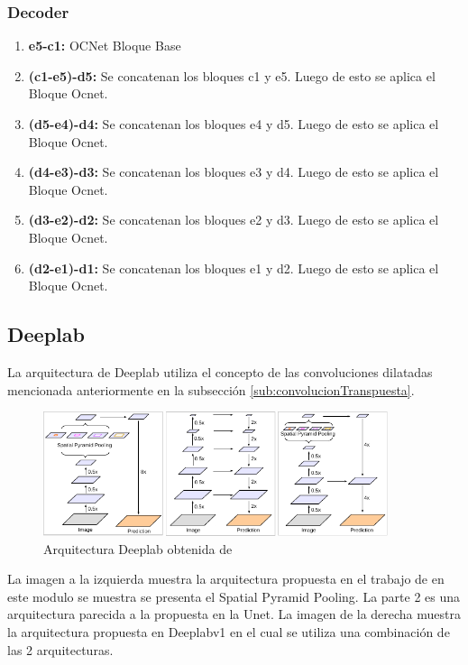 \subsubsection{Decoder}
    \begin{enumerate}
    \item \textbf{e5-c1:} OCNet Bloque Base
    \item \textbf{(c1-e5)-d5:}  Se concatenan los bloques c1 y e5. Luego de esto se  aplica el Bloque Ocnet.
    \item \textbf{(d5-e4)-d4:}  Se concatenan los bloques e4 y d5. Luego de esto se  aplica el Bloque Ocnet.
    \item \textbf{(d4-e3)-d3:}  Se concatenan los bloques e3 y d4. Luego de esto se  aplica el Bloque Ocnet.
    \item \textbf{(d3-e2)-d2:}  Se concatenan los bloques e2 y d3. Luego de esto se  aplica el Bloque Ocnet.
    \item \textbf{(d2-e1)-d1:}  Se concatenan los bloques e1 y d2. Luego de esto se  aplica el Bloque Ocnet.
    


    \end{enumerate}{}


\subsection{Deeplab}
La arquitectura de Deeplab utiliza el concepto de las convoluciones dilatadas mencionada anteriormente en la subsección  \ref{sub:convolucionTranspuesta}.

\begin{figure}[H]
    \centering
    \includegraphics[width = 0.9\textwidth]{images/redes/deeplabv1.pdf}
    \caption{Arquitectura Deeplab obtenida de \cite{Chen2018}}
    \label{fig:deeplabv1}
\end{figure}{}
La imagen a la izquierda muestra la arquitectura propuesta en el trabajo de \cite{zhao2017pyramid} en este modulo se muestra se presenta el Spatial Pyramid Pooling. La parte 2 es una arquitectura parecida a la propuesta en la Unet. La imagen de la derecha muestra la arquitectura propuesta en Deeplabv1 en el cual se utiliza una combinación de las 2 arquitecturas. 

